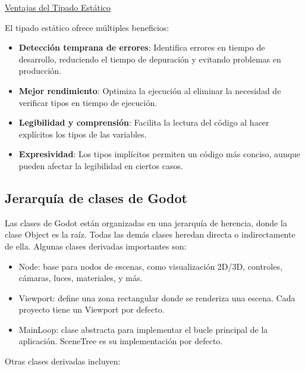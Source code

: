 \documentclass[12pt]{report} %
\providecommand{\tightlist}{%
  \setlength{\itemsep}{0pt}\setlength{\parskip}{0pt}}
\begin{document}
\underline{Ventajas del Tipado Estático}

El tipado estático ofrece múltiples beneficios:

\begin{itemize}
\tightlist
\item
  \textbf{Detección temprana de errores}: Identifica errores en tiempo
  de desarrollo, reduciendo el tiempo de depuración y evitando problemas
  en producción.
\item
  \textbf{Mejor rendimiento}: Optimiza la ejecución al eliminar la
  necesidad de verificar tipos en tiempo de ejecución.
\item
  \textbf{Legibilidad y comprensión}: Facilita la lectura del código al
  hacer explícitos los tipos de las variables.
\item
  \textbf{Expresividad}: Los tipos implícitos permiten un código más
  conciso, aunque pueden afectar la legibilidad en ciertos casos.
\end{itemize}

\hypertarget{jerarquuxeda-de-clases-de-godot}{%
\subsection{Jerarquía de clases de
Godot}\label{jerarquuxeda-de-clases-de-godot}}

Las clases de Godot están organizadas en una jerarquía de herencia,
donde la clase Object es la raíz. Todas las demás clases heredan directa
o indirectamente de ella. Algunas clases derivadas importantes son:

\begin{itemize}
\tightlist
\item
  Node: base para nodos de escenas, como visualización 2D/3D, controles,
  cámaras, luces, materiales, y más.
\item
  Viewport: define una zona rectangular donde se renderiza una escena.
  Cada proyecto tiene un Viewport por defecto.
\item
  MainLoop: clase abstracta para implementar el bucle principal de la
  aplicación. SceneTree es su implementación por defecto.
\end{itemize}

Otras clases derivadas incluyen:
\end{document}
